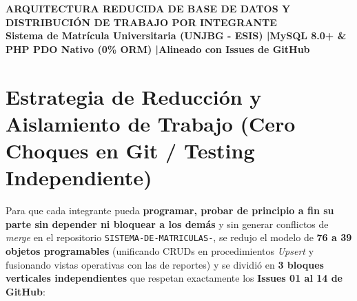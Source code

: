 \documentclass[10pt,a4paper,landscape]{article}
\begin{document}
\begin{center}
    {\LARGE \textbf{\textcolor{unjbgNavy}{ARQUITECTURA REDUCIDA DE BASE DE DATOS Y DISTRIBUCIÓN DE TRABAJO POR INTEGRANTE}}}\\[3pt]
    {\normalsize \textbf{Sistema de Matrícula Universitaria (UNJBG - ESIS) \quad|\quad MySQL 8.0+ \& PHP PDO Nativo (0\% ORM) \quad|\quad Alineado con Issues de GitHub}}\\[4pt]
\end{center}

\section{Estrategia de Reducción y Aislamiento de Trabajo (Cero Choques en Git / Testing Independiente)}

Para que cada integrante pueda \textbf{programar, probar de principio a fin su parte sin depender ni bloquear a los demás} y sin generar conflictos de \textit{merge} en el repositorio \texttt{SISTEMA-DE-MATRICULAS-}, se redujo el modelo de \textbf{76 a 39 objetos programables} (unificando CRUDs en procedimientos \textit{Upsert} y fusionando vistas operativas con las de reportes) y se dividió en \textbf{3 bloques verticales independientes} que respetan exactamente los \textbf{Issues 01 al 14 de GitHub}:
\end{document}
